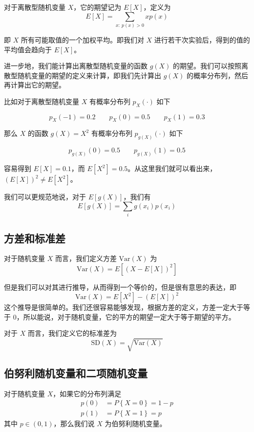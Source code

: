 \documentclass[utf8,a4paper,nofonts,9pt]{ctexbook}
\begin{document}
对于离散型随机变量 $X$，它的期望记为 $E[X]$，定义为
\[
    E[X] = \sum_{x:\ p(x) > 0} x p(x)
\]

即 $X$ 所有可能取值的一个加权平均。即我们对 $X$ 进行若干次实验后，得到的值的平均值会趋向于 $E[X]$。

进一步地，我们能计算出离散型随机变量的函数 $g(X)$ 的期望。我们可以按照离散型随机变量的期望的定义来计算，即我们先计算出 $g(X)$ 的概率分布列，然后再计算出它的期望。

\begin{exampleBox}
    比如对于离散型随机变量 $X$ 有概率分布列 $p_X( \cdot )$ 如下

    \[
        p_X(-1) = 0.2 \qquad p_X(0) = 0.5 \qquad p_X(1) = 0.3
    \]

    那么 $X$ 的函数 $g(X) = X^2$ 有概率分布列 $p_{g(X)}( \cdot )$ 如下

    \[
        p_{g(X)}(0) = 0.5 \qquad p_{g(X)}(1) = 0.5
    \]

    容易得到 $E[X] = 0.1$，而 $E[X^2] = 0.5$。从这里我们就可以看出来，$(E[X])^2 \ne E[X^2]$。
\end{exampleBox}

我们可以更规范地说，对于 $E[g(X)]$，我们有
\[
    E[g(X)] = \sum_{i} g(x_i) p(x_i)
\]

\subsection{方差和标准差}

对于随机变量 $X$ 而言，我们定义方差 $\textrm{Var}(X)$ 为
\[
    \textrm{Var}(X) = E\left[ (X - E[X])^2 \right]
\]

但是我们可以对其进行推导，从而得到一个等价的，但是很有意思的表达，即
\[
    \textrm{Var}(X) = E[X^2] - (E[X])^2
\]
这个推导是很简单的。我们还很容易能够发现，根据方差的定义，方差一定大于等于 $0$，所以能说，对于随机变量，它的平方的期望一定大于等于期望的平方。

对于 $X$ 而言，我们定义它的标准差为
\[
    \textrm{SD}(X) = \sqrt{\textrm{Var}(X)}
\]

\subsection{伯努利随机变量和二项随机变量}

对于随机变量 $X$，如果它的分布列满足
\begin{align*}
    p(0) & = P\left\{ X = 0 \right\} = 1 - p \\
    p(1) & = P\left\{ X = 1 \right\} = p
\end{align*}
其中 $p \in (0, 1)$，那么我们说 $X$ 为伯努利随机变量。
\end{document}
